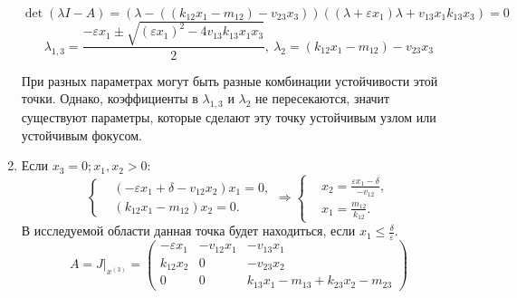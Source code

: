 \begin{enumerate}
            \[
                \det(\lambda I - A) = \left( \lambda - \left( \left( k_{12} x_1 - m_{12} \right) - v_{23} x_3 \right) \right) \left( (\lambda + \varepsilon x_1)\lambda + v_{13} x_1 k_{13} x_3 \right) = 0
            \]
            \[
                \lambda_{1,3} = \frac{-\varepsilon x_1 \pm \sqrt{ (\varepsilon x_1)^2 - 4 v_{13} k_{13} x_1 x_3 } }{2}, ~ 
                \lambda_2 = \left( k_{12} x_1 - m_{12} \right) - v_{23} x_3
            \]

            При разных параметрах могут быть разные комбинации устойчивости этой точки. Однако, коэффициенты в \( \lambda_{1,3} \) и \( \lambda_2 \) не пересекаются, значит существуют параметры, которые сделают эту точку устойчивым узлом или устойчивым фокусом.

        \item Если \( x_3 = 0; x_1, x_2 > 0 \):
            \[
                \left\{\begin{split}
                    & \left( -\varepsilon x_1 + \delta - v_{12} x_2 \right)x_1 = 0, \\
                    & ( k_{12} x_1 -m _{12} ) x_2 = 0. 
                \end{split}\right.
                \Rightarrow
                \left\{\begin{split}
                    & x_2 = \frac{ \varepsilon x_1 - \delta }{ -v_{12} }, \\
                    & x_1 = \frac{m_{12}}{k_{12}}. 
                \end{split}\right.
            \]
            В исследуемой области данная точка будет находиться, если \( x_1 \leq \frac{\delta}{\varepsilon}  \).
            \[
                A = J\big|_{x^{(3)}} = \left(
                    \begin{matrix}
                        -\varepsilon x_1 & -v_{12}  x_1  & -v_{13} x_1 \\
                        k_{12} x_2 & 0 & -v_{23} x_2 \\
                        0 & 0 & k_{13} x_1 - m_{13} + k_{23} x_2 - m_{23}
                    \end{matrix}
                \right)
            \]


\end{enumerate}
